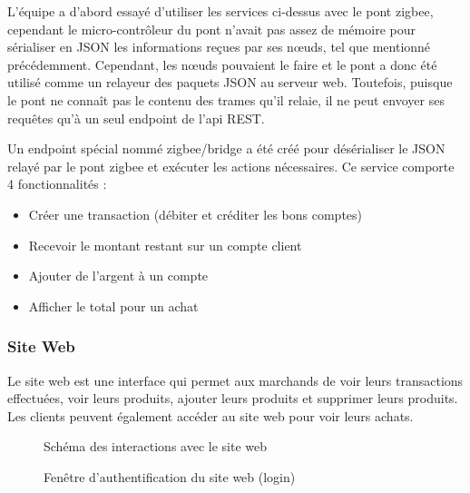 		L’équipe a d’abord essayé d’utiliser les services ci-dessus avec le pont zigbee, cependant le micro-contrôleur du pont n’avait pas assez de mémoire pour sérialiser en JSON les informations reçues par ses n\oe{}uds, tel que mentionné précédemment. Cependant, les n\oe{}uds pouvaient le faire et le pont a donc été utilisé comme un relayeur des paquets JSON au serveur web. Toutefois, puisque le pont ne connaît pas le contenu des trames qu’il relaie, il ne peut envoyer ses requêtes qu’à un seul \og endpoint \fg{} de l’api REST. 

		Un \og endpoint \fg{} spécial nommé \og zigbee/bridge \fg{} a été créé pour désérialiser le JSON relayé par le pont zigbee et exécuter les actions nécessaires. Ce service comporte 4 fonctionnalités : 
		\begin{itemize}
			\item Créer une transaction (débiter et créditer les bons comptes)
			\item Recevoir le montant restant sur un compte client
			\item Ajouter de l’argent à un compte
			\item Afficher le total pour un achat
		\end{itemize}

		
		\subsubsection{Site Web}
		Le site web est une interface qui permet aux marchands de voir leurs transactions effectuées, voir leurs produits, ajouter leurs produits et supprimer leurs produits. Les clients peuvent également accéder au site web pour voir leurs achats.
		
		\begin{figure}[p]
			\centering
			
			\caption{Schéma des interactions avec le site web}
			\label{fig.schema}
		\end{figure}

		\begin{figure}[p]
			\caption{Fenêtre d’authentification du site web (login)}
			\label{fig.auth}
		\end{figure}

